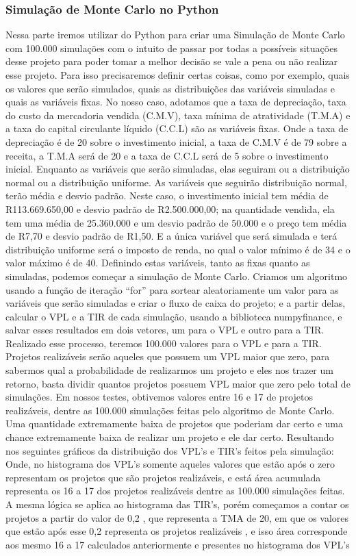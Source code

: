 \documentclass[11pt]{article}
\begin{document}
\subsubsection{\textbf{Simulação de Monte Carlo no Python }}
Nessa parte iremos utilizar do Python para criar uma Simulação de Monte Carlo com 100.000 simulações com o intuito de passar por todas a possíveis situações desse projeto para poder tomar a melhor decisão se vale a pena ou não realizar esse projeto.
Para isso precisaremos definir certas coisas, como por exemplo, quais os valores que serão simulados, quais as distribuições das variáveis simuladas e quais as variáveis fixas.
No nosso caso, adotamos que a taxa de depreciação, taxa do custo da mercadoria vendida (C.M.V), taxa mínima de atratividade (T.M.A) e a taxa do capital circulante líquido (C.C.L) são as variáveis fixas. Onde a taxa de depreciação é de 20 sobre o investimento inicial, a taxa de C.M.V é de 79 sobre a receita, a T.M.A será de 20 e a taxa de C.C.L será de 5 sobre o investimento inicial. 
Enquanto as variáveis que serão simuladas, elas seguiram ou a distribuição normal ou a distribuição uniforme. As variáveis que seguirão distribuição normal, terão média e desvio padrão. Neste caso, o investimento inicial tem média de R113.669.650,00 e desvio padrão de R2.500.000,00; na quantidade vendida, ela tem uma média de 25.360.000 e um desvio padrão de 50.000 e o preço tem média de R7,70 e desvio padrão de R1,50. E a única variável que será simulada e terá distribuição uniforme será o imposto de renda, no qual o valor mínimo é de 34 e o valor máximo é de 40.
Definindo estas variáveis, tanto as fixas quanto as simuladas, podemos começar a simulação de Monte Carlo. Criamos um algoritmo usando a função de iteração “for” para sortear aleatoriamente um valor para as variáveis que serão simuladas e criar o fluxo de caixa do projeto; e a partir delas, calcular o VPL e a TIR de cada simulação, usando a biblioteca numpyfinance, e salvar esses resultados em dois vetores, um para o VPL e outro para a TIR.
Realizado esse processo, teremos 100.000 valores para o VPL e para a TIR. Projetos realizáveis serão aqueles que possuem um VPL maior que zero, para sabermos qual a probabilidade de realizarmos um projeto e eles nos trazer um retorno, basta dividir quantos projetos possuem VPL maior que zero pelo total de simulações. Em nossos testes, obtivemos valores entre 16 e 17 de projetos realizáveis, dentre as 100.000 simulações feitas pelo algoritmo de Monte Carlo. Uma quantidade extremamente baixa de projetos que poderiam dar certo e uma chance extremamente baixa de realizar um projeto e ele dar certo.
Resultando nos seguintes gráficos da distribuição dos VPL’s e TIR’s feitos pela simulação:
Onde, no histograma dos VPL’s somente aqueles valores que estão após o zero representam os projetos que são projetos realizáveis, e está área acumulada representa os 16 a 17 dos projetos realizáveis dentre as 100.000 simulações feitas. A mesma lógica se aplica ao histograma das TIR’s, porém começamos a contar os projetos a partir do valor de 0,2 , que representa a TMA de 20, em que os valores que estão após esse 0,2 representa os projetos realizáveis , e isso área corresponde aos mesmo 16 a 17 calculados anteriormente e presentes no histograma dos VPL’s
\end{document}
